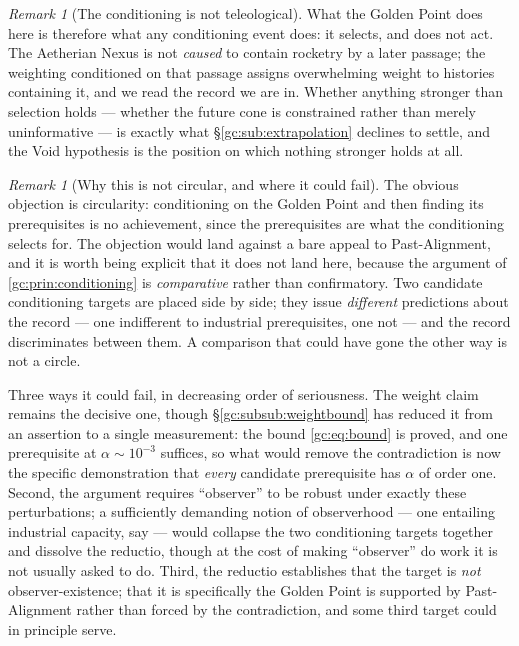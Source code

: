 \documentclass[11pt]{article}
\numberwithin{equation}{section}
\theoremstyle{plain}
\theoremstyle{definition}
\theoremstyle{remark}
\newtheorem{remark}[theorem]{Remark}
\begin{document}
\begin{remark}[The conditioning is not teleological]
What the Golden Point does here is therefore what any conditioning event
does: it selects, and does not act. The Aetherian Nexus is not
\emph{caused} to contain rocketry by a later passage; the weighting
conditioned on that passage assigns overwhelming weight to histories
containing it, and we read the record we are in. Whether anything
stronger than selection holds --- whether the future cone is constrained
rather than merely uninformative --- is exactly what
\S\ref{gc:sub:extrapolation} declines to settle, and the Void hypothesis
is the position on which nothing stronger holds at all.
\end{remark}

\begin{remark}[Why this is not circular, and where it could fail]
\label{gc:rem:circularity}
The obvious objection is circularity: conditioning on the Golden Point
and then finding its prerequisites is no achievement, since the
prerequisites are what the conditioning selects for. The objection would
land against a bare appeal to Past-Alignment, and it is worth being
explicit that it does not land here, because the argument of
\ref{gc:prin:conditioning} is \emph{comparative} rather than
confirmatory. Two candidate conditioning targets are placed side by
side; they issue \emph{different} predictions about the record --- one
indifferent to industrial prerequisites, one not --- and the record
discriminates between them. A comparison that could have gone the other
way is not a circle.

Three ways it could fail, in decreasing order of seriousness. The weight claim remains the decisive one, though
\S\ref{gc:subsub:weightbound} has reduced it from an assertion to a
single measurement: the bound \eqref{gc:eq:bound} is proved, and one
prerequisite at $\alpha\sim10^{-3}$ suffices, so what would remove the
contradiction is now the specific demonstration that \emph{every}
candidate prerequisite has $\alpha$ of order one. Second, the
argument requires ``observer'' to be robust under exactly these
perturbations; a sufficiently demanding notion of observerhood --- one
entailing industrial capacity, say --- would collapse the two
conditioning targets together and dissolve the reductio, though at the
cost of making ``observer'' do work it is not usually asked to do.
Third, the reductio establishes that the target is \emph{not}
observer-existence; that it is specifically the Golden Point is
supported by Past-Alignment rather than forced by the contradiction, and
some third target could in principle serve.
\end{remark}
\end{document}
